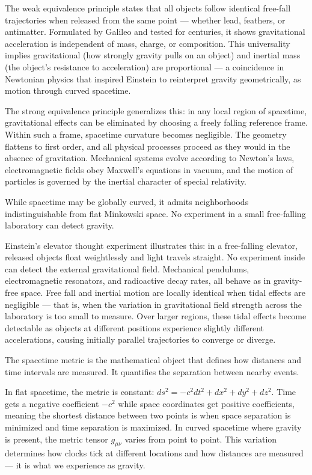 
The weak equivalence principle states that all objects follow identical free-fall trajectories when released from the same point — whether lead, feathers, or antimatter. Formulated by Galileo and tested for centuries, it shows gravitational acceleration is independent of mass, charge, or composition. This universality implies gravitational (how strongly gravity pulls on an object) and inertial mass (the object's resistance to acceleration) are proportional — a coincidence in Newtonian physics that inspired Einstein to reinterpret gravity geometrically, as motion through curved spacetime.

The strong equivalence principle generalizes this: in any local region of spacetime, gravitational effects can be eliminated by choosing a freely falling reference frame. Within such a frame, spacetime curvature becomes negligible. The geometry flattens to first order, and all physical processes proceed as they would in the absence of gravitation. Mechanical systems evolve according to Newton's laws, electromagnetic fields obey Maxwell's equations in vacuum, and the motion of particles is governed by the inertial character of special relativity.

While spacetime may be globally curved, it admits neighborhoods indistinguishable from flat Minkowski space. No experiment in a small free-falling laboratory can detect gravity.

Einstein's elevator thought experiment illustrates this: in a free-falling elevator, released objects float weightlessly and light travels straight. No experiment inside can detect the external gravitational field. Mechanical pendulums, electromagnetic resonators, and radioactive decay rates, all behave as in gravity-free space. Free fall and inertial motion are locally identical when tidal effects are negligible — that is, when the variation in gravitational field strength across the laboratory is too small to measure. Over larger regions, these tidal effects become detectable as objects at different positions experience slightly different accelerations, causing initially parallel trajectories to converge or diverge.

The spacetime metric is the mathematical object that defines how distances and time intervals are measured. It quantifies the separation between nearby events.

In flat spacetime, the metric is constant: \(ds^2 = -c^2 dt^2 + dx^2 + dy^2 + dz^2\). Time gets a negative coefficient \(-c^2\) while space coordinates get positive coefficients, meaning the shortest distance between two points is when space separation is minimized and time separation is maximized. In curved spacetime where gravity is present, the metric tensor \(g_{\mu\nu}\) varies from point to point. This variation determines how clocks tick at different locations and how distances are measured — it is what we experience as gravity.

